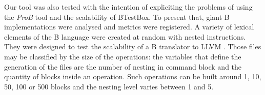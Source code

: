 \documentclass[runningheads]{llncs}
\begin{document}

Our tool was also tested with the intention of expliciting the problems of using the \textit{ProB} tool and the scalability of BTestBox. To present that, giant B implementations were analysed and metrics were registered. A variety of lexical elements of the B language were created at random with nested instructions. They were designed to test the scalability of a B translator to LLVM \cite{deharbebtestbox}. Those files may be classified by the size of the operations: the variables that define the generation of the files are the number of nesting in command block and the quantity of blocks inside an operation. Such operations can be built around 1, 10, 50, 100 or 500 blocks and the nesting level varies between 1 and 5.
\end{document}
